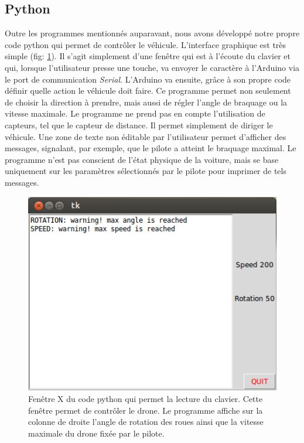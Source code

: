 \documentclass[a4paper,11pt]{report}
\begin{document}
{\begin{enumerate}
\begin{enumerate}
\section{Python}
Outre les programmes mentionnés auparavant, nous avons développé notre propre
code python qui permet de contrôler le
véhicule. L'interface graphique est très simple
(fig: \ref{pythonenvironnement}). Il s'agit simplement d'une fenêtre qui est à
l'écoute du clavier et qui, lorsque l'utilisateur presse une touche, va
envoyer le caractère à l'Arduino via le port de communication
\textit{Serial}. L'Arduino va ensuite, grâce à son propre code définir quelle action le
véhicule doit faire. Ce programme permet non seulement de choisir la direction
à prendre, mais aussi de régler l'angle de braquage ou la vitesse maximale. Le programme ne prend pas en
compte l'utilisation de capteurs, tel que le capteur de distance. Il permet
simplement de diriger le véhicule. Une zone de texte non éditable par
l'utilisateur permet d'afficher des messages, signalant, par exemple, que le
pilote a atteint le braquage maximal. Le programme n'est pas conscient de
l'état physique de la voiture, mais se base uniquement sur les paramètres
sélectionnés par le pilote pour imprimer de tels messages. 

\begin{center}
\begin{figure}[!h]
\includegraphics[scale=0.7]{Python_GUI_screen_example.png}
\caption[Interface graphique Python]{Fenêtre X du code python qui permet la lecture du clavier. Cette fenêtre permet de contrôler le drone. Le programme affiche sur la colonne de droite l'angle de rotation des roues ainsi que la vitesse maximale du drone fixée par le pilote.\label{pythonenvironnement}}
\end{figure}
\end{center}



\end{enumerate}
\end{enumerate}}
\end{document}
